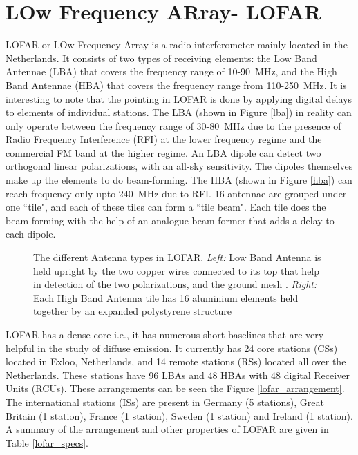 \documentclass[../main/thesis_msc.tex]{subfiles}
\begin{document}
\section{LOw Frequency ARray- LOFAR}    
LOFAR or LOw Frequency Array is a radio interferometer mainly located in the Netherlands. It consists of two types of receiving elements: the Low Band Antennae (LBA) that covers the frequency range of 10-90~MHz, and the High Band Antennae (HBA) that covers the frequency range from 110-250~MHz. It is interesting to note that the pointing in LOFAR is done by applying digital delays to elements of individual stations. The LBA (shown in Figure \ref{lba}) in reality can only operate between the frequency range of 30-80~MHz due to the presence of Radio Frequency Interference (RFI) at the lower frequency regime and the commercial FM band at the higher regime. An LBA dipole can detect two orthogonal linear polarizations, with an all-sky sensitivity. The dipoles themselves make up the elements to do beam-forming. The HBA (shown in Figure \ref{hba}) can reach frequency only upto 240~MHz due to RFI. 16 antennae are grouped under one ``tile", and each of these tiles can form a ``tile beam". Each tile does the beam-forming with the help of an analogue beam-former that adds a delay to each dipole.
\begin{figure}%
    \centering
    \qquad
    \caption{The different Antenna types in LOFAR. \textit{Left:} Low Band Antenna is held upright by the two copper wires connected to its top that help in detection of the two polarizations, and the ground mesh \citep{lba}. \textit{Right:} Each High Band Antenna tile has 16 aluminium elements held together by an expanded polystyrene structure \citep{LOFAR}}%
\end{figure}
LOFAR has a dense core i.e., it has numerous short baselines that are very helpful in the study of diffuse emission. It currently has 24 core stations (CSs) located in Exloo, Netherlands, and 14 remote stations (RSs) located all over the Netherlands. These stations have 96 LBAs and 48 HBAs with 48 digital Receiver Units (RCUs). These arrangements can be seen the Figure \ref{lofar_arrangement}. The international stations (ISs) are present in Germany (5 stations), Great Britain (1 station), France (1 station), Sweden (1 station) and Ireland (1 station). A summary of the arrangement and other properties of LOFAR are given in Table \ref{lofar_specs}. 
\end{document}
